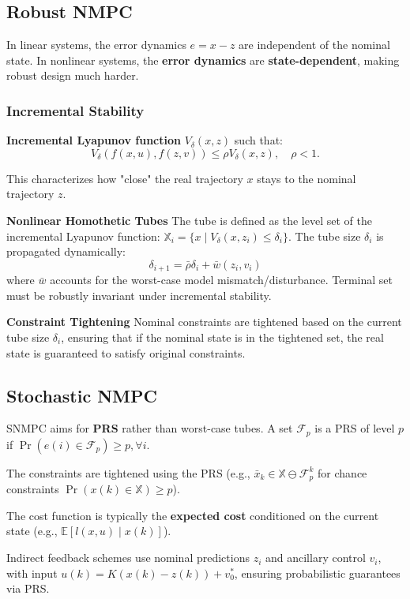 \subsection{Robust NMPC}

In linear systems, the error dynamics $e=x-z$
are independent of the nominal state.
In nonlinear systems, the \textbf{error dynamics} are \textbf{state-dependent},
making robust design much harder.

\subsubsection{Incremental Stability}

\textbf{Incremental Lyapunov function}
$V_\delta(x, z)$ such that:
\[V_\delta(f(x,u), f(z,v)) \le \rho V_\delta(x, z), \quad \rho < 1.\]

This characterizes how "close" the real trajectory $x$ stays to the
nominal trajectory $z$.

\textbf{Nonlinear Homothetic Tubes}
The tube is defined as the level set of the
incremental Lyapunov function:
$\mathbb{X}_i = \{x \mid V_\delta(x, z_i) \le \delta_i\}$.
The tube size $\delta_i$ is propagated dynamically:
\[\delta_{i+1} = \bar{\rho} \delta_i + \bar{w}(z_i, v_i)\]
where $\bar{w}$ accounts for the worst-case model
mismatch/disturbance. Terminal set must be robustly invariant under
incremental stability.

\textbf{Constraint Tightening}
Nominal constraints are tightened
based on the current tube size $\delta_i$,
ensuring that if the nominal state is in the tightened set,
the real state is guaranteed to satisfy original constraints.

\subsection{Stochastic NMPC}

SNMPC aims for \textbf{PRS} rather than worst-case tubes.
A set $\mathcal{F}_p$ is a PRS of level $p$ if $\Pr(e(i) \in
\mathcal{F}_p) \ge p, \forall i$.

The constraints are tightened using the PRS (e.g., $\bar{x}_k \in
  \mathbb{X} \ominus \mathcal{F}_p^k$ for chance constraints $\Pr(x(k)
\in \mathbb{X}) \ge p$).

The cost function is typically the \textbf{expected cost}
conditioned on the current state (e.g., $\mathbb{E}[l(x,u) \mid x(k)]$).

Indirect feedback schemes use nominal predictions $z_i$ and ancillary
control $v_i$, with input $u(k) = K(x(k) - z(k)) + v_0^*$, ensuring
probabilistic guarantees via PRS.

